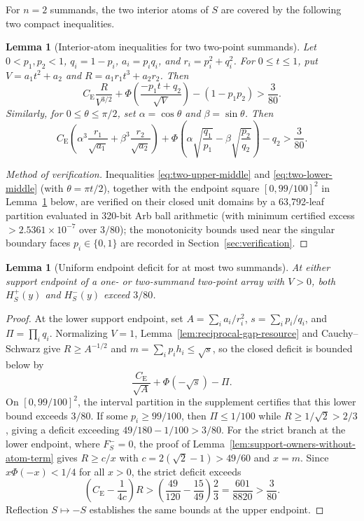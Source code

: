 \documentclass[11pt]{article}
\numberwithin{equation}{section}
\newtheorem{lemma}[theorem]{Lemma}
\theoremstyle{definition}
\theoremstyle{remark}
\newcommand{\be}{C_{\mathrm E}}
\begin{document}
For $n=2$ summands, the two interior atoms of $S$ are covered by the
following two compact inequalities.

\begin{samepage}
\begin{lemma}[Interior-atom inequalities for two two-point summands]\label{lem:two-compact}
Let $0<p_1,p_2<1$, $q_i=1-p_i$, $a_i=p_iq_i$, and $r_i=p_i^2+q_i^2$.
For $0\leq t\leq1$, put $V=a_1t^2+a_2$ and $R=a_1r_1t^3+a_2r_2$. Then
\begin{equation}\label{eq:two-upper-middle}
 \be\frac{R}{V^{3/2}}+
 \Phi\left(\frac{-p_1t+q_2}{\sqrt V}\right)-(1-p_1p_2)>\frac3{80}.
\end{equation}
Similarly, for $0\leq\theta\leq\pi/2$, set $\alpha=\cos\theta$ and
$\beta=\sin\theta$. Then
\begin{equation}\label{eq:two-lower-middle}
 \be\left(\alpha^3\frac{r_1}{\sqrt{a_1}}+
                  \beta^3\frac{r_2}{\sqrt{a_2}}\right)
 +\Phi\left(\alpha\sqrt{\frac{q_1}{p_1}}
            -\beta\sqrt{\frac{p_2}{q_2}}\right)-q_2>\frac3{80}.
\end{equation}
\end{lemma}
\end{samepage}
\begin{proof}[Method of verification]
Inequalities \eqref{eq:two-upper-middle} and \eqref{eq:two-lower-middle}
(with $\theta=\pi t/2$), together with the endpoint square $[0,99/100]^2$ in
Lemma~\ref{lem:pair-endpoint-margin} below, are verified on their closed unit
domains by a 63,792-leaf partition evaluated in 320-bit Arb ball arithmetic
(with minimum certified excess $>2.5361\times10^{-7}$ over $3/80$); the
monotonicity bounds used near the singular boundary faces $p_i\in\{0,1\}$ are
recorded in Section~\ref{sec:verification}.
\end{proof}

\begin{lemma}[Uniform endpoint deficit for at most two summands]\label{lem:pair-endpoint-margin}
At either support endpoint of a one- or two-summand two-point array with
$V>0$, both $H_S^+(y)$ and $H_S^-(y)$ exceed $3/80$.
\end{lemma}
\begin{proof}
At the lower support endpoint, set $A=\sum_i a_i/r_i^2$, $s=\sum_i p_i/q_i$,
and $\Pi=\prod_iq_i$. Normalizing $V=1$, Lemma~\ref{lem:reciprocal-gap-resource}
and Cauchy--Schwarz give $R\ge A^{-1/2}$ and $m=\sum_i p_i h_i\le\sqrt s$, so
the closed deficit is bounded below by
\[
 \frac{\be}{\sqrt A}+\Phi(-\sqrt s)-\Pi.
\]
On $[0,99/100]^2$, the interval partition in the supplement certifies that
this lower bound exceeds $3/80$. If some $p_i\ge99/100$, then $\Pi\le1/100$
while $R\ge1/\sqrt2>2/3$, giving a deficit exceeding $49/180-1/100>3/80$.
For the strict branch at the lower endpoint, where $F_S^-=0$, the proof of
Lemma~\ref{lem:support-owners-without-atom-term} gives $R\ge c/x$ with
$c=2(\sqrt2-1)>49/60$ and $x=m$. Since $x\Phi(-x)<1/4$ for all $x>0$, the
strict deficit exceeds
\[
 \left(\be-\frac1{4c}\right)R>\left(\frac{49}{120}-\frac{15}{49}\right)\frac23
 =\frac{601}{8820}>\frac3{80}.
\]
Reflection $S\mapsto-S$ establishes the same bounds at the upper endpoint.
\end{proof}
\end{document}
